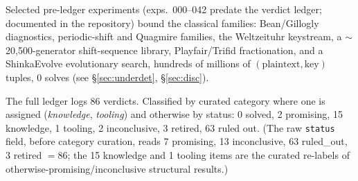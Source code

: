\documentclass[11pt]{article}
\theoremstyle{plain}
\theoremstyle{definition}
\begin{document}
\noindent Selected pre-ledger experiments (exps.~000--042 predate the verdict
ledger; documented in the repository) bound the classical families: Bean/Gillogly
diagnostics, periodic-shift and Quagmire families, the Weltzeituhr keystream, a
$\sim$20{,}500-generator shift-sequence library, Playfair/Trifid fractionation, and a
ShinkaEvolve evolutionary search, hundreds of millions of $(\text{plaintext},
\text{key})$ tuples, $0$ solves (see \S\ref{sec:underdet}, \S\ref{sec:disc}).

\noindent The full ledger logs 86 verdicts. Classified by curated category where one
is assigned (\emph{knowledge}, \emph{tooling}) and otherwise by status: 0 solved,
2 promising, 15 knowledge, 1 tooling, 2 inconclusive, 3 retired, 63 ruled out. (The
raw \texttt{status} field, before category curation, reads 7 promising, 13
inconclusive, 63 ruled\_out, 3 retired $=86$; the 15 knowledge and 1 tooling items
are the curated re-labels of otherwise-promising/inconclusive structural results.)
\end{document}
